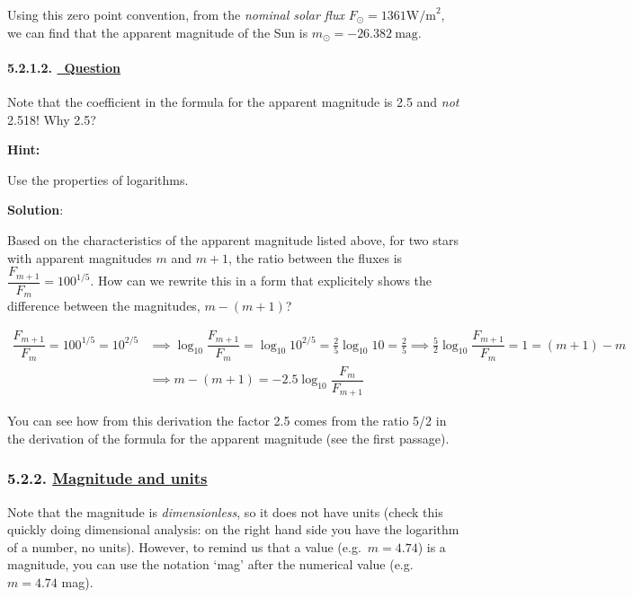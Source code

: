 \documentclass[
  letterpaper,
  DIV=11,
  numbers=noendperiod]{scrartcl}
\let\oldparagraph\paragraph
\renewcommand{\paragraph}[1]{\oldparagraph{#1}\mbox{}}
\begin{document}
Using this zero point convention, from the \emph{nominal solar flux}
\(F_\odot = 1361 \mathrm{W/m}^2\), we can find that the apparent
magnitude of the Sun is \(m_\odot=-26.382\ \mathrm{mag}\).

\hypertarget{question-1}{%
\paragraph{\texorpdfstring{5.2.1.2.
\protect\hyperlink{toc0_}{~Question}}{5.2.1.2. ~Question}}\label{question-1}}

Note that the coefficient in the formula for the apparent magnitude is
2.5 and \emph{not} 2.518! Why 2.5?

\textbf{Hint:}

Use the properties of logarithms.

\textbf{Solution}:

Based on the characteristics of the apparent magnitude listed above, for
two stars with apparent magnitudes \(m\) and \(m+1\), the ratio between
the fluxes is \(\dfrac{F_{m+1}}{F_m}=100^{1/5}\). How can we rewrite
this in a form that explicitely shows the difference between the
magnitudes, \(m-(m+1)\)?

\begin{align}
\dfrac{F_{m+1}}{F_m}=100^{1/5}=10^{2/5} &\implies \log_{10}{\dfrac{F_{m+1}}{F_m}}=\log_{10}{10^{2/5}}=\frac{2}{5}\log_{10}{10}=\frac{2}{5} \implies \frac{5}{2}\log_{10}{\dfrac{F_{m+1}}{F_m}} = 1 = (m+1) - m \\
&\implies m-(m+1)=-2.5\log_{10}{\dfrac{F_m}{F_{m+1}}}
\end{align}

You can see how from this derivation the factor 2.5 comes from the ratio
5/2 in the derivation of the formula for the apparent magnitude (see the
first passage).

\hypertarget{magnitude-and-units}{%
\subsubsection{\texorpdfstring{5.2.2.
\protect\hyperlink{toc0_}{Magnitude and
units}}{5.2.2. Magnitude and units}}\label{magnitude-and-units}}

Note that the magnitude is \emph{dimensionless}, so it does not have
units (check this quickly doing dimensional analysis: on the right hand
side you have the logarithm of a number, no units). However, to remind
us that a value (e.g.~\(m=4.74\)) is a magnitude, you can use the
notation `mag' after the numerical value (e.g.~\(m=4.74\) mag).
\end{document}
